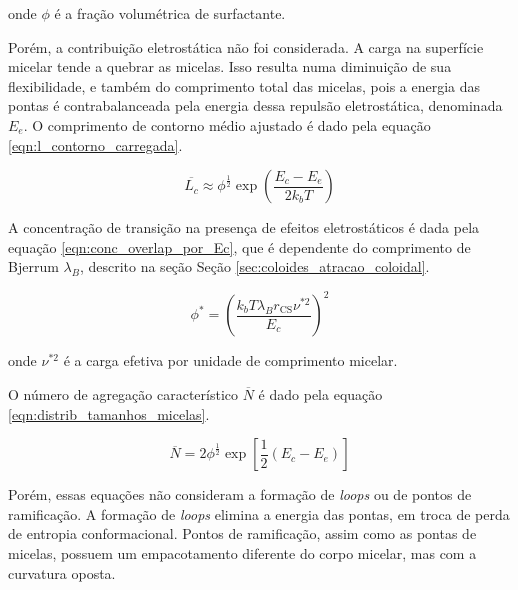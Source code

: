 		\noindent onde \(\phi\) é a fração volumétrica de surfactante. 
		
		Porém, a contribuição eletrostática não foi considerada. A carga na superfície micelar tende a quebrar as micelas. Isso resulta numa diminuição de sua flexibilidade, e também do comprimento total das micelas, pois a energia das pontas é contrabalanceada pela energia dessa repulsão eletrostática, denominada \(E_e\). O comprimento de contorno médio ajustado é dado pela equação \ref{eqn:l_contorno_carregada}.
		
		\begin{equation}
			\overline{L_c} \approx \phi^{\frac{1}{2}} \exp \left(\dfrac{E_c - E_e}{2k_bT}\right)
			\label{eqn:l_contorno_carregada}
		\end{equation} %

		A concentração de transição na presença de efeitos eletrostáticos é dada pela equação \ref{eqn:conc_overlap_por_Ec}, que é dependente do comprimento de Bjerrum \(\lambda_B\), descrito na seção Seção \ref{sec:coloides_atracao_coloidal}.
		
 		\begin{equation}
			\phi^* = \left( \frac{k_b T \lambda_B r_{\mathrm{CS}} \nu^{*2}}{E_c} \right) ^ 2
			\label{eqn:conc_overlap_por_Ec}
		\end{equation} %
	
		\noindent onde \(\nu^{*2}\) é a carga efetiva por unidade de comprimento micelar.
		 
		O número de agregação característico \(\overline{N}\) é dado pela equação \ref{eqn:distrib_tamanhos_micelas}.
		
		\begin{equation}
			\overline{N} = 2 \phi ^{\frac{1}{2}} \exp \left[ \frac{1}{2} \left( E_c - E_e \right) \right]
			\label{eqn:distrib_tamanhos_micelas}
		\end{equation} %
		 
		Porém, essas equações não consideram a formação de \emph{loops} ou de pontos de ramificação. A formação de \emph{loops} elimina a energia das pontas, em troca de perda de entropia conformacional. Pontos de ramificação, assim como as pontas de micelas, possuem um empacotamento diferente do corpo micelar, mas com a curvatura oposta. %
		
